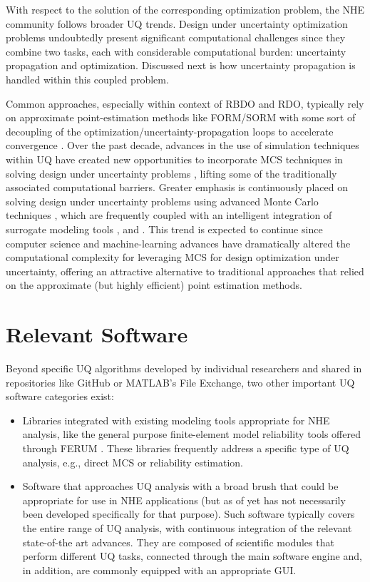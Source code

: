 With respect to the solution of the corresponding optimization problem, the NHE community follows broader UQ trends. Design under uncertainty optimization problems undoubtedly present significant computational challenges since they combine two tasks, each with considerable computational burden: uncertainty propagation and optimization. Discussed next is how uncertainty propagation is handled within this coupled problem.

Common approaches, especially within context of RBDO and RDO, typically rely on approximate point-estimation methods like FORM/SORM \citep{papadimitriou2018reliability} with some sort of decoupling of the optimization/uncertainty-propagation loops to accelerate convergence \citep{beyer2007robust}. Over the past decade, advances in the use of simulation techniques within UQ have created new opportunities to incorporate MCS techniques in solving design under uncertainty problems \citep{spall2003introduction,flint2016developing}, lifting some of the traditionally associated computational barriers. Greater emphasis is continuously placed on solving design under uncertainty problems using advanced Monte Carlo techniques \citep{medina2014adaptive}, which are frequently coupled with an intelligent integration of surrogate modeling tools \citep{dubourg2011reliabilitybased, bichon2013efficient}, and \citep{zhang2018adaptive}. This trend is expected to continue since computer science and machine-learning advances have dramatically altered the computational complexity for leveraging MCS for design optimization under uncertainty, offering an attractive alternative to traditional approaches that relied on the approximate (but highly efficient) point estimation methods.   

\section{Relevant Software}
\label{sec:uq_tools}

Beyond specific UQ algorithms developed by individual researchers and shared in repositories like GitHub or MATLAB's File Exchange, two other important UQ software categories exist:

\begin{itemize}
    \item Libraries integrated with existing modeling tools appropriate for NHE analysis, like the general purpose finite-element model reliability tools offered through FERUM \citep{bourinet2009review}. These libraries frequently address a specific type of UQ analysis, e.g., direct MCS or reliability estimation.
    \vspace{2mm}
    \item Software that approaches UQ analysis with a broad brush that could be appropriate for use in NHE applications (but as of yet has not necessarily been developed specifically for that purpose). Such software typically covers the entire range of UQ analysis, with continuous integration of the relevant state-of-the art advances. They are composed of scientific modules that perform different UQ tasks, connected through the main software engine and, in addition, are commonly equipped with an appropriate GUI. 
\end{itemize}
	
